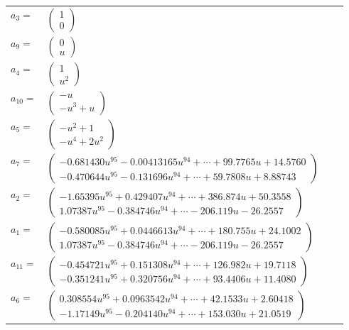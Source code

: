 \documentclass[1p]{elsarticle_modified}
\theoremstyle{definition}
\begin{document}
\begin{tabular}{m{7pt} m{180pt} m{7pt} m{180pt} }
\flushright $a_{3}=$&$\begin{pmatrix}1\\0\end{pmatrix}$ \\
\flushright $a_{9}=$&$\begin{pmatrix}0\\u\end{pmatrix}$ \\
\flushright $a_{4}=$&$\begin{pmatrix}1\\u^2\end{pmatrix}$ \\
\flushright $a_{10}=$&$\begin{pmatrix}- u\\- u^3+u\end{pmatrix}$ \\
\flushright $a_{5}=$&$\begin{pmatrix}- u^2+1\\- u^4+2 u^2\end{pmatrix}$ \\
\flushright $a_{7}=$&$\begin{pmatrix}-0.681430 u^{95}-0.00413165 u^{94}+\cdots+99.7765 u+14.5760\\-0.470644 u^{95}-0.131696 u^{94}+\cdots+59.7808 u+8.88743\end{pmatrix}$ \\
\flushright $a_{2}=$&$\begin{pmatrix}-1.65395 u^{95}+0.429407 u^{94}+\cdots+386.874 u+50.3558\\1.07387 u^{95}-0.384746 u^{94}+\cdots-206.119 u-26.2557\end{pmatrix}$ \\
\flushright $a_{1}=$&$\begin{pmatrix}-0.580085 u^{95}+0.0446613 u^{94}+\cdots+180.755 u+24.1002\\1.07387 u^{95}-0.384746 u^{94}+\cdots-206.119 u-26.2557\end{pmatrix}$ \\
\flushright $a_{11}=$&$\begin{pmatrix}-0.454721 u^{95}+0.151308 u^{94}+\cdots+126.982 u+19.7118\\-0.351241 u^{95}+0.320756 u^{94}+\cdots+93.4406 u+11.4080\end{pmatrix}$ \\
\flushright $a_{6}=$&$\begin{pmatrix}0.308554 u^{95}+0.0963542 u^{94}+\cdots+42.1533 u+2.60418\\-1.17149 u^{95}-0.204140 u^{94}+\cdots+153.030 u+21.0519\end{pmatrix}$ \\

\end{tabular}
\end{document}

